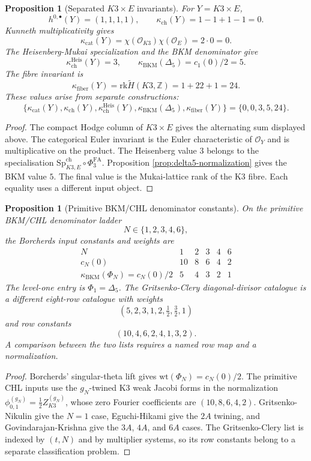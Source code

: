 \documentclass[11pt]{article}
\newtheorem{proposition}[theorem]{Proposition}
\providecommand{\Z}{\mathbb{Z}}
\providecommand{\cO}{\mathcal{O}}
\providecommand{\rk}{\mathrm{rk}}
\providecommand{\SpCh}{\mathrm{Sp}^{\mathrm{ch}}}
\providecommand{\wt}{\mathrm{wt}}
\providecommand{\PhiFA}{\Phi^{\mathrm{FA}}}
\providecommand{\kBKM}{\kappa_{\mathrm{BKM}}}
\providecommand{\kcat}{\kappa_{\mathrm{cat}}}
\providecommand{\kch}{\kappa_{\mathrm{ch}}}
\providecommand{\kHeis}{\kappa_{\mathrm{ch}}^{\mathrm{Heis}}}
\providecommand{\kfib}{\kappa_{\mathrm{fiber}}}
\providecommand{\Dfive}{\Delta_5}
\begin{document}
\begin{proposition}[Separated \(K3\times E\) invariants]
\label{prop:k3e-invariants}
For \(Y=K3\times E\),
\[
  h^{0,\bullet}(Y)=(1,1,1,1),
  \qquad
  \kch(Y)=1-1+1-1=0.
\]
Kunneth multiplicativity gives
\[
  \kcat(Y)=\chi(\cO_{K3})\chi(\cO_E)=2\cdot0=0.
\]
The Heisenberg-Mukai specialization and the BKM denominator give
\[
  \kHeis(Y)=3,
  \qquad
  \kBKM(\Dfive)=c_1(0)/2=5.
\]
The fibre invariant is
\[
  \kfib(Y)=\rk\widetilde H(K3,\Z)=1+22+1=24.
\]
These values arise from separate constructions:
\[
  \{\kcat(Y),\kch(Y),\kHeis(Y),
  \kBKM(\Dfive),\kfib(Y)\}
  =
  \{0,0,3,5,24\}.
\]
\end{proposition}

\begin{proof}
The compact Hodge column of \(K3\times E\) gives the alternating sum
displayed above.  The categorical Euler invariant is the Euler
characteristic of \(\cO_Y\) and is multiplicative on the product.  The
Heisenberg value \(3\) belongs to the specialisation
\(\SpCh_{K3,E}\circ\PhiFA_3\).  Proposition
\ref{prop:delta5-normalization} gives the BKM value \(5\).  The final
value is the Mukai-lattice rank of the K3 fibre.  Each equality uses a
different input object.
\end{proof}

\begin{proposition}[Primitive BKM/CHL denominator constants]
\label{prop:primitive-chl-constants}
On the primitive BKM/CHL denominator ladder
\[
  N\in\{1,2,3,4,6\},
\]
the Borcherds input constants and weights are
\[
\begin{array}{c|ccccc}
N&1&2&3&4&6\\
\hline
c_N(0)&10&8&6&4&2\\
\kBKM(\Phi_N)=c_N(0)/2&5&4&3&2&1
\end{array}
\]
The level-one entry is \(\Phi_1=\Dfive\).  The Gritsenko-Clery
diagonal-divisor catalogue is a different eight-row catalogue with
weights
\[
  (5,2,3,1,2,\tfrac12,\tfrac32,1)
\]
and row constants
\[
  (10,4,6,2,4,1,3,2).
\]
A comparison between the two lists requires a named row map and a
normalization.
\end{proposition}

\begin{proof}
Borcherds' singular-theta lift gives
\(\wt(\Phi_N)=c_N(0)/2\).  The primitive CHL inputs use the
\(g_N\)-twined K3 weak Jacobi forms in the normalization
\(\phi_{0,1}^{(g_N)}=\frac12 Z_{K3}^{(g_N)}\), whose zero Fourier
coefficients are \((10,8,6,4,2)\).  Gritsenko-Nikulin give the \(N=1\)
case, Eguchi-Hikami give the \(2A\) twining, and
Govindarajan-Krishna give the \(3A\), \(4A\), and \(6A\) cases.  The
Gritsenko-Clery list is indexed by \((t,N)\) and by multiplier systems,
so its row constants belong to a separate classification problem.
\end{proof}
\end{document}
